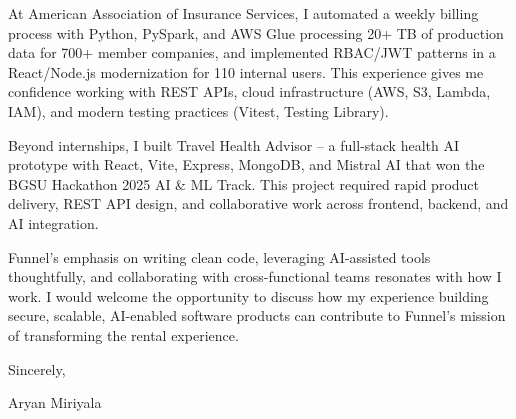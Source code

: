 \documentclass[letterpaper,11pt]{article}
\begin{document}
At American Association of Insurance Services, I automated a weekly billing process with Python, PySpark, and AWS Glue processing 20+ TB of production data for 700+ member companies, and implemented RBAC/JWT patterns in a React/Node.js modernization for 110 internal users. This experience gives me confidence working with REST APIs, cloud infrastructure (AWS, S3, Lambda, IAM), and modern testing practices (Vitest, Testing Library).

Beyond internships, I built Travel Health Advisor -- a full-stack health AI prototype with React, Vite, Express, MongoDB, and Mistral AI that won the BGSU Hackathon 2025 AI \& ML Track. This project required rapid product delivery, REST API design, and collaborative work across frontend, backend, and AI integration.

Funnel's emphasis on writing clean code, leveraging AI-assisted tools thoughtfully, and collaborating with cross-functional teams resonates with how I work. I would welcome the opportunity to discuss how my experience building secure, scalable, AI-enabled software products can contribute to Funnel's mission of transforming the rental experience.

Sincerely,

Aryan Miriyala
\end{document}
